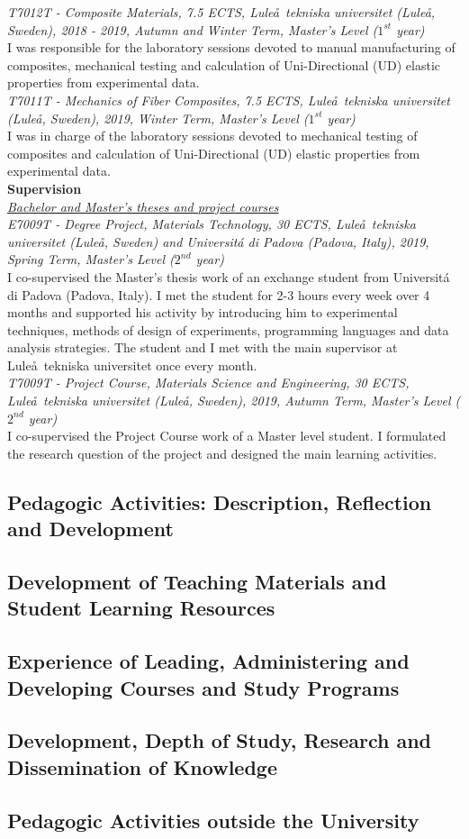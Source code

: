 \documentclass[
  a4paper, 
]{fortysecondscv}
\begin{document}
\textit{T7012T - Composite Materials, 7.5 ECTS, Lule\aa\ tekniska universitet (Lule\aa, Sweden), 2018 - 2019, Autumn and Winter Term, Master's Level ($1^{st}$ year)}\\
I was responsible for the laboratory sessions devoted to manual manufacturing of composites, mechanical testing and calculation of Uni-Directional (UD) elastic properties from experimental data.\\[6pt]
\textit{T7011T - Mechanics of Fiber Composites, 7.5 ECTS, Lule\aa\ tekniska universitet (Lule\aa, Sweden), 2019, Winter Term, Master's Level ($1^{st}$ year)}\\
I was in charge of the laboratory sessions devoted to mechanical testing of composites and calculation of Uni-Directional (UD) elastic properties from experimental data.\\[6pt]
\textbf{Supervision}\\[6pt]
\underline{\emph{Bachelor and Master's theses and project courses}}\\[6pt]
\textit{E7009T - Degree Project, Materials Technology, 30 ECTS, Lule\aa\ tekniska universitet (Lule\aa, Sweden) and Universit\'a di Padova (Padova, Italy), 2019, Spring Term, Master's Level ($2^{nd}$ year)}\\
I co-supervised the Master's thesis work of an exchange student from Universit\'a di Padova (Padova, Italy). I met the student for 2-3 hours every week over 4 months and supported his activity by introducing him to experimental techniques, methods of design of experiments, programming languages and data analysis strategies. The student and I met with the main supervisor at Lule\aa\ tekniska universitet once every month.\\[6pt]
\textit{T7009T - Project Course, Materials Science and Engineering, 30 ECTS, Lule\aa\ tekniska universitet (Lule\aa, Sweden), 2019, Autumn Term, Master's Level ($2^{nd}$ year)}\\
I co-supervised the Project Course work of a Master level student. I formulated the research question of the project and designed the main learning activities.\\

\subsection{Pedagogic Activities: Description, Reflection and Development}

\subsection{Development of Teaching Materials and Student Learning Resources}

\subsection{Experience of Leading, Administering and Developing Courses and Study Programs}

\subsection{Development, Depth of Study, Research and Dissemination of Knowledge}

\subsection{Pedagogic Activities outside the University}
\end{document}
